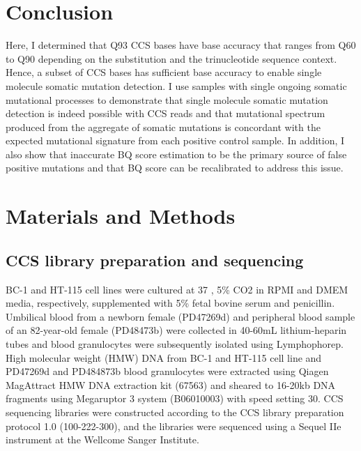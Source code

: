 


\section{Conclusion}

Here, I determined that Q93 CCS bases have base accuracy that ranges from Q60 to Q90 depending on the substitution and the trinucleotide sequence context. Hence, a subset of CCS bases has sufficient base accuracy to enable single molecule somatic mutation detection. I use samples with single ongoing somatic mutational processes to demonstrate that single molecule somatic mutation detection is indeed possible with CCS reads and that mutational spectrum produced from the aggregate of somatic mutations is concordant with the expected mutational signature from each positive control sample. In addition, I also show that inaccurate BQ score estimation to be the primary source of false positive mutations and that BQ score can be recalibrated to address this issue. 

\section{Materials and Methods}

\subsection{CCS library preparation and sequencing}


BC-1 and HT-115 cell lines were cultured at 37 \textcelsius, 5\% CO2 in RPMI and DMEM media, respectively, supplemented with 5\% fetal bovine serum and penicillin. Umbilical blood from a newborn female (PD47269d) and peripheral blood sample of an 82-year-old female (PD48473b) were collected in 40-60mL lithium-heparin tubes and blood granulocytes were subsequently isolated using Lymphophorep. High molecular weight (HMW) DNA from BC-1 and HT-115 cell line and PD47269d and PD484873b blood granulocytes were extracted using Qiagen MagAttract HMW DNA extraction kit (67563) and sheared to 16-20kb DNA fragments using Megaruptor 3 system (B06010003) with speed setting 30. CCS sequencing libraries were constructed according to the CCS library preparation protocol 1.0 (100-222-300), and the libraries were sequenced using a Sequel IIe instrument at the Wellcome Sanger Institute. 


